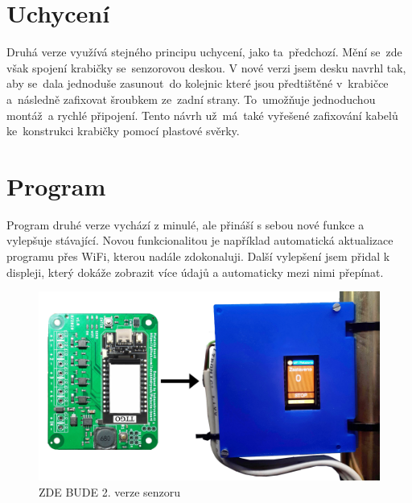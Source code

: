 \section{Uchycení}
Druhá verze využívá stejného principu uchycení, jako ta~předchozí. 
Mění se~zde však spojení krabičky se~senzorovou deskou. 
V nové verzi jsem desku navrhl tak, aby se~dala jednoduše zasunout~do kolejnic které jsou předtištěné v~krabičce a~následně zafixovat šroubkem ze~zadní strany.
To~umožňuje jednoduchou montáž~a rychlé připojení.
Tento návrh už~má~také vyřešené zafixování kabelů ke~konstrukci krabičky pomocí plastové svěrky.


\section{Program}
Program druhé verze vychází z minulé, ale přináší s sebou nové funkce a vylepšuje stávající.
Novou funkcionalitou je například automatická aktualizace programu přes WiFi, kterou nadále zdokonaluji.
Další vylepšení jsem přidal k displeji, který dokáže zobrazit více údajů a automaticky mezi nimi přepínat.

\begin{figure}[htbp]
    \centering
    \includegraphics[width=\textwidth]{img/SenzorV1.png}
    \caption{ZDE BUDE 2. verze senzoru}
    \label{fig:SenzorNaStroji}
\end{figure}


\newpage
